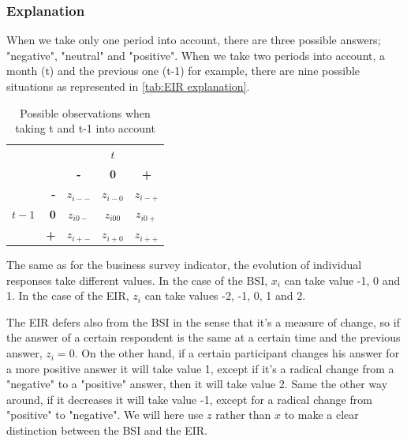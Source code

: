 \documentclass[12pt,a4paper,oneside]{book}
\begin{document}


\subsubsection{Explanation}

When we take only one period into account, there are three possible answers; "negative", "neutral" and "positive".
When we take two periods into account, a month (t) and the previous one (t-1) for example, there are nine possible situations as represented in \autoref{tab:EIR explanation}. 


\begin{table}[htp!]
    \centering
    \begin{tabular}{r | r | c c c | }
    \multicolumn{1}{r}{} & \multicolumn{1}{r}{} &    \multicolumn{3}{c}{$t$} \\ \cline{3-5}
    \multicolumn{1}{r}{} &         & \textbf{-} & \textbf{0} & \textbf{+} \\ \cline{2-5}
          &    \textbf{-} & $z_{i--}$    & $z_{i-0}$    & $z_{i-+}$ \\ 
    $t-1$ & \textbf{0}  & $z_{i0-}$    & $z_{i00}$    & $z_{i0+}$ \\
          &    \textbf{+} & $z_{i+-}$    & $z_{i+0}$    & $z_{i++}$ \\ \cline{2-5}
    \end{tabular}
    \caption{Possible observations when taking t and t-1 into account}
    \label{tab:EIR explanation}
\end{table}

The same as for the business survey indicator, the evolution of individual responses take different values. In the case of the BSI, $x_i$ can take value -1, 0 and 1. In the case of the EIR, $z_i$ can take values -2, -1, 0, 1 and 2.

The EIR defers also from the BSI in the sense that it's a measure of change, so if the answer of a certain respondent is the same at a certain time and the previous answer, $z_i=0$. 
On the other hand, if a certain participant changes his answer for a more positive answer it will take value 1, except if it's a radical change from a "negative" to a "positive" answer, then it will take value 2.
Same the other way around, if it decreases it will take value -1, except for a radical change from "positive" to "negative".
We will here use $z$ rather than $x$ to make a clear distinction between the BSI and the EIR.
\end{document}
